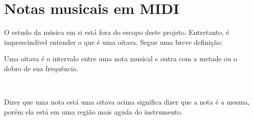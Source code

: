 


\chapter{Notas musicais em MIDI}

    O estudo da música em si está fora do escopo deste projeto. Entretanto, é imprescindível entender o que é uma oitava. Segue uma breve definição: \epigraph{Uma oitava é o intervalo entre uma nota musical e outra com a metade ou o dobro de sua frequência.}{~\cite{WikipediaOitava}}

    Dizer que uma nota está uma oitava acima significa dizer que a nota é a mesma, porém ela está em uma região mais aguda do instrumento.

